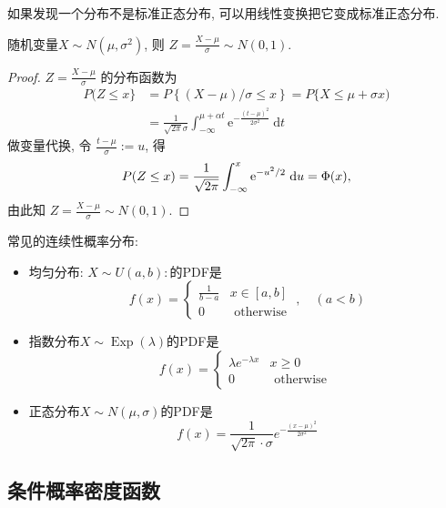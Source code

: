 如果发现一个分布不是标准正态分布, 可以用线性变换把它变成标准正态分布.

\begin{proposition}
    随机变量$X\sim N(\mu,\sigma^2)$, 则 $Z=\frac{X-\mu}{\sigma}\sim N(0,1)$.
\end{proposition}


\begin{proof}
    { $Z=\frac{X-\mu}{\sigma}$ 的分布函数为$$
            \begin{aligned}
                P(Z \leq x\} & =P\left\{{(X-\mu)}/{\sigma} \leq x\right\}=P\{X \leq \mu+\sigma x)                                         \\
                                   & =\frac{1}{\sqrt{2 \pi} \sigma} \int_{-\infty}^{\mu+\alpha t} \mathrm{e}^{-\frac{(t-\mu)^2}{2 \sigma^2}} \mathrm{~d} t
            \end{aligned}
        $$
        做变量代换, 令 $\frac{t-\mu}{\sigma}:=u$, 得$$
            \small P(Z \leq x)=\frac{1}{\sqrt{2 \pi}} \int_{-\infty}^x \mathrm{e}^{-u^2 / 2} \mathrm{~d} u=\Phi(x),
        $$
        由此知 $Z=\frac{X-\mu}{\sigma} \sim N(0,1)$.}
\end{proof}

\begin{takeaway}
    常见的连续性概率分布: 
    \begin{itemize}
        \item 均匀分布: $X\sim U(a, b): $的PDF是$$
        f(x)=\left\{\begin{array}{ll}
        \frac{1}{b-a} & x \in[a, b] \\
        0 & \text { otherwise }
        \end{array}, \quad(a<b)\right.
        $$
        \item 指数分布${X} \sim \operatorname{Exp}(\lambda)$的PDF是$$
        f(x)= \begin{cases}\lambda e^{-\lambda x} & x \geq 0 \\ 0 & \text { otherwise }\end{cases}
        $$
        \item 正态分布$X\sim N(\mu,\sigma)$的PDF是$$
        f(x)=\frac{1}{\sqrt{2 \pi} \cdot \sigma} e^{-\frac{(x-\mu)^2}{2 \sigma^2}}
        $$
    \end{itemize}
\end{takeaway}

\subsection{条件概率密度函数}

